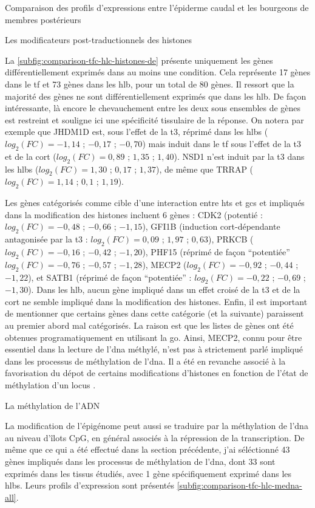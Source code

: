\documentclass[../main.tex]{subfiles}
\begin{document}
\begin{chapter}{Comparaison des profils d'expressions entre l'épiderme caudal et les bourgeons de membres postérieurs}
\begin{section}{Les modificateurs post-traductionnels des histones}


La \autoref{subfig:comparison-tfc-hlc-histones-de} présente uniquement les gènes différentiellement exprimés dans au moins une condition.
Cela représente 17 gènes dans le \gls{tf} et 73 gènes dans les \gls{hlb}, pour un total de 80 gènes.
Il ressort que la majorité des gènes ne sont différentiellement exprimés que dans les \gls{hlb}.
De façon intéressante, là encore le chevauchement entre les deux sous ensembles de gènes est restreint et souligne ici une spécificité tissulaire de la réponse.
On notera par exemple que JHDM1D est, sous l'effet de la \gls{t3}, réprimé dans les \glspl{hlb} ($log_2(FC)=-1,14$ ; $-0,17$ ; $-0,70$) mais induit dans le \gls{tf} sous l'effet de la \gls{t3} et de la \gls{cort} ($log_2(FC)=0,89$ ; $1,35$ ; $1,40$).
NSD1 n'est induit par la \gls{t3} dans les \glspl{hlb} ($log_2(FC)=1,30$ ; $0,17$ ; $1,37$), de même que TRRAP ($log_2(FC)=1,14$ ; $0,1$ ; $1,19$).
\par
Les gènes catégorisés comme cible d'une interaction entre \glspl{ht} et \glspl{gc} et impliqués dans la modification des histones incluent 6 gènes :
CDK2 (potentié : $log_2(FC)=-0,48$ ; $-0,66$ ; $-1,15$), GFI1B (induction \gls{cort}-dépendante antagonisée par la \gls{t3} : $log_2(FC)=0,09$ ; $1,97$ ; $0,63$), PRKCB ($log_2(FC)=-0,16$ ; $-0,42$ ; $-1,20$), PHF15 (réprimé de façon ``potentiée'' $log_2(FC)=-0,76$ ; $-0,57$ ; $-1,28$), MECP2 ($log_2(FC)=-0,92$ ; $-0,44$ ; $-1,22$),  et SATB1 (réprimé de façon ``potentiée'' : $log_2(FC)=-0,22$ ; $-0,69$ ; $-1,30$).
Dans les \gls{hlb}, aucun gène impliqué dans un effet croisé de la \gls{t3} et de la \gls{cort} ne semble impliqué dans la modification des histones.
Enfin, il est important de mentionner que certains gènes dans cette catégorie (et la suivante) paraissent au premier abord mal catégorisés.
La raison est que les listes de gènes ont été obtenues programatiquement en utilisant la \gls{go}.
Ainsi, MECP2, connu pour être essentiel dans la lecture de l'\gls{dna} méthylé, n'est pas à strictement parlé impliqué dans les processus de méthylation de l'\gls{dna}.
Il a été en revanche associé à la favorisation du dépot de certains modifications d'histones en fonction de l'état de méthylation d'un locus \citep{Fuks2003}.

\end{section}


\begin{section}{La méthylation de l'ADN}

La modification de l'épigénome peut aussi se traduire par la méthylation de l'\gls{dna} au niveau d'îlots CpG, en général associés à la répression de la transcription.
De même que ce qui a été effectué dans la section précédente, j'ai séléctionné 43 gènes impliqués dans les processus de méthylation de l'\gls{dna}, dont 33 sont exprimés dans les tissus étudiés, avec 1 gène spécifiquement exprimé dans les \glspl{hlb}.
Leurs profils d'expression sont présentés \autoref{subfig:comparison-tfc-hlc-medna-all}.


\end{section}
\end{chapter}
\end{document}
